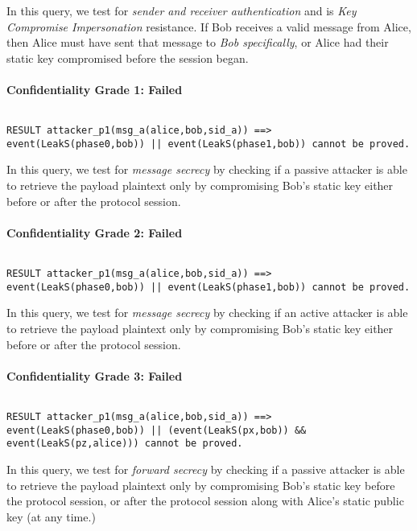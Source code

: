 In this query, we test for \emph{sender and receiver authentication} and is \emph{Key Compromise Impersonation} resistance. If Bob receives a valid message from Alice, then Alice must have sent that message to \emph{Bob specifically}, or Alice had their static key compromised before the session began.


\paragraph{Confidentiality Grade 1: Failed}$ $
\begin{lstlisting}
RESULT attacker_p1(msg_a(alice,bob,sid_a)) ==> event(LeakS(phase0,bob)) || event(LeakS(phase1,bob)) cannot be proved.
\end{lstlisting}

In this query, we test for \emph{message secrecy} by checking if a passive attacker is able to retrieve the payload plaintext only by compromising Bob's static key either before or after the protocol session.


\paragraph{Confidentiality Grade 2: Failed}$ $
\begin{lstlisting}
RESULT attacker_p1(msg_a(alice,bob,sid_a)) ==> event(LeakS(phase0,bob)) || event(LeakS(phase1,bob)) cannot be proved.
\end{lstlisting}

In this query, we test for \emph{message secrecy} by checking if an active attacker is able to retrieve the payload plaintext only by compromising Bob's static key either before or after the protocol session.


\paragraph{Confidentiality Grade 3: Failed}$ $
\begin{lstlisting}
RESULT attacker_p1(msg_a(alice,bob,sid_a)) ==> event(LeakS(phase0,bob)) || (event(LeakS(px,bob)) && event(LeakS(pz,alice))) cannot be proved.
\end{lstlisting}

In this query, we test for \emph{forward secrecy} by checking if a passive attacker is able to retrieve the payload plaintext only by compromising Bob's static key before the protocol session, or after the protocol session along with Alice's static public key (at any time.)


